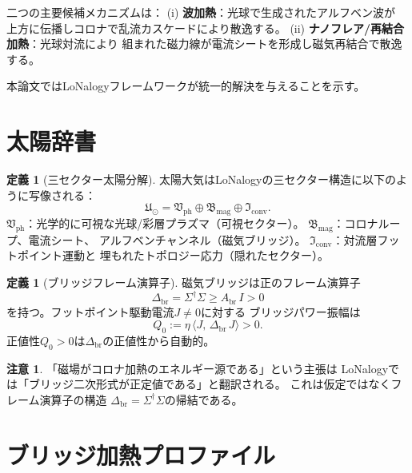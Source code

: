 \documentclass[12pt]{article}
\theoremstyle{plain}
\theoremstyle{definition}
\newtheorem{definition}[theorem]{定義}
\newtheorem{remark}[theorem]{注意}
\numberwithin{equation}{section}
\newcommand{\br}{\mathrm{br}}
\newcommand{\ph}{\mathrm{ph}}
\newcommand{\fU}{\mathfrak{U}}
\newcommand{\fI}{\mathfrak{I}}
\newcommand{\fV}{\mathfrak{V}}
\newcommand{\fB}{\mathfrak{B}}
\begin{document}
二つの主要候補メカニズムは：
(i) \textbf{波加熱}：光球で生成されたアルフベン波が
上方に伝播しコロナで乱流カスケードにより散逸する。
(ii) \textbf{ナノフレア/再結合加熱}：光球対流により
組まれた磁力線が電流シートを形成し磁気再結合で散逸する。

本論文ではLoNalogyフレームワークが統一的解決を与えることを示す。


\section{太陽辞書}\label{sec:dictionary}

\begin{definition}[三セクター太陽分解]\label{def:solar}
太陽大気はLoNalogyの三セクター構造に以下のように写像される：
\begin{equation}\label{eq:solarsectors}
\fU_\odot = \fV_{\ph}\oplus\fB_{\mathrm{mag}}\oplus\fI_{\mathrm{conv}}.
\end{equation}
$\fV_{\ph}$：光学的に可視な光球/彩層プラズマ（可視セクター）。
$\fB_{\mathrm{mag}}$：コロナループ、電流シート、
アルフベンチャンネル（磁気ブリッジ）。
$\fI_{\mathrm{conv}}$：対流層フットポイント運動と
埋もれたトポロジー応力（隠れたセクター）。
\end{definition}

\begin{definition}[ブリッジフレーム演算子]\label{def:bridgeop}
磁気ブリッジは正のフレーム演算子
\begin{equation}\label{eq:frameop}
\Delta_{\br} = \Sigma^\dagger\Sigma \geq A_{\br}\,I > 0
\end{equation}
を持つ。フットポイント駆動電流$J\neq 0$に対する
ブリッジパワー振幅は
\begin{equation}\label{eq:Q0}
\boxed{Q_0 := \eta\,\langle J,\,\Delta_{\br}\,J\rangle > 0.}
\end{equation}
正値性$Q_0>0$は$\Delta_{\br}$の正値性から自動的。
\end{definition}

\begin{remark}
「磁場がコロナ加熱のエネルギー源である」という主張は
LoNalogyでは「ブリッジ二次形式が正定値である」と翻訳される。
これは仮定ではなくフレーム演算子の構造
$\Delta_{\br}=\Sigma^\dagger\Sigma$の帰結である。
\end{remark}


\section{ブリッジ加熱プロファイル}\label{sec:heating}
\end{document}
